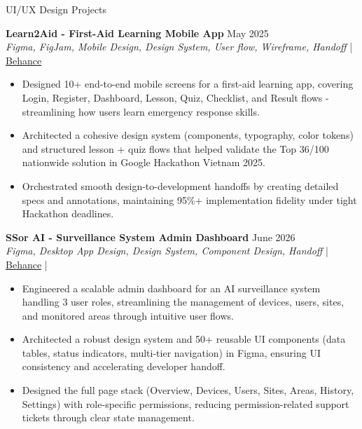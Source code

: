 \documentclass{resume}
\begin{document}
\begin{rSection}{UI/UX Design Projects}
    \vspace{-0.5em}
    \item \textbf{Learn2Aid - First-Aid Learning Mobile App} \hfill May 2025\\
    {\small \textit{Figma, FigJam, Mobile Design, Design System, User flow, Wireframe, Handoff}} \hfill | \href{https://www.behance.net/gallery/251703697/UXUI-Learn2Aid-Google-Hackathon-VietNam-2025}{Behance}
    \begin{itemize}
        \itemsep -3pt {}
        \item Designed 10+ end-to-end mobile screens for a first-aid learning app, covering Login, Register, Dashboard, Lesson, Quiz, Checklist, and Result flows - streamlining how users learn emergency response skills.
        \item Architected a cohesive design system (components, typography, color tokens) and structured lesson + quiz flows that helped validate the Top 36/100 nationwide solution in Google Hackathon Vietnam 2025.
        \item Orchestrated smooth design-to-development handoffs by creating detailed specs and annotations, maintaining 95\%+ implementation fidelity under tight Hackathon deadlines.
    \end{itemize}

    \item \textbf{SSor AI - Surveillance System Admin Dashboard} \hfill June 2026\\
    {\small \textit{Figma, Desktop App Design, Design System, Component Design, Handoff}} \hfill | \href{https://www.behance.net/gallery/251701789/UXUI-SSor-AI-Admin-Dashboard}{Behance} |
    \begin{itemize}
        \itemsep -3pt {}
        \item Engineered a scalable admin dashboard for an AI surveillance system handling 3 user roles, streamlining the management of devices, users, sites, and monitored areas through intuitive user flows.
        \item Architected a robust design system and 50+ reusable UI components (data tables, status indicators, multi-tier navigation) in Figma, ensuring UI consistency and accelerating developer handoff.
        \item Designed the full page stack (Overview, Devices, Users, Sites, Areas, History, Settings) with role-specific permissions, reducing permission-related support tickets through clear state management.
    \end{itemize}



\end{rSection}
\end{document}
